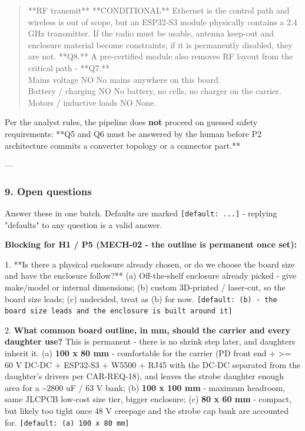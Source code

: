 \documentclass[11pt,a4paper]{article}
\begin{document}
\begin{quote}
\textbar{} {*}{*}RF transmit{*}{*} \textbar{} {*}{*}CONDITIONAL{*}{*} \textbar{} Ethernet is the control path and wireless is out of scope, but an ESP32-S3 module physically contains a 2.4 GHz transmitter. If the radio must be usable, antenna keep-out and enclosure material become constraints; if it is permanently disabled, they are not. {*}{*}Q8.{*}{*} A pre-certified module also removes RF layout from the critical path - {*}{*}Q7.{*}{*} \textbar{}\\
\textbar{} Mains voltage \textbar{} NO \textbar{} No mains anywhere on this board. \textbar{}\\
\textbar{} Battery / charging \textbar{} NO \textbar{} No battery, no cells, no charger on the carrier. \textbar{}\\
\textbar{} Motors / inductive loads \textbar{} NO \textbar{} None. \textbar{}
\end{quote}
Per the analyst rules, the pipeline does \textbf{not} proceed on guessed safety requirements: {*}{*}Q5 and Q6 must be answered by the human before P2 architecture commits a converter topology or a connector part.{*}{*}

---

\subsubsection*{9. Open questions}
Answer these in one batch. Defaults are marked \texttt{{[}default: ...{]}} - replying "defaults" to any question is a valid answer.

\textbf{Blocking for H1 / P5 (MECH-02 - the outline is permanent once set):}

1. {*}{*}Is there a physical enclosure already chosen, or do we choose the board size and have the enclosure follow?{*}{*} (a) Off-the-shelf enclosure already picked - give make/model or internal dimensions; (b) custom 3D-printed / laser-cut, so the board size leads; (c) undecided, treat as (b) for now. \texttt{{[}default: (b) - the board size leads and the enclosure is built around it{]}}

2. \textbf{What common board outline, in mm, should the carrier and every daughter use?} This is permanent - there is no shrink step later, and daughters inherit it. (a) \textbf{100 x 80 mm} - comfortable for the carrier (PD front end + \textgreater{}= 60 V DC-DC + ESP32-S3 + W5500 + RJ45 with the DC-DC separated from the daughter's drivers per CAR-REQ-18), and leaves the strobe daughter enough area for a \textasciitilde{}2800 uF / 63 V bank; (b) \textbf{100 x 100 mm} - maximum headroom, same JLCPCB low-cost size tier, bigger enclosure; (c) \textbf{80 x 60 mm} - compact, but likely too tight once 48 V creepage and the strobe cap bank are accounted for. \texttt{{[}default: (a) 100 x 80 mm{]}}
\end{document}
